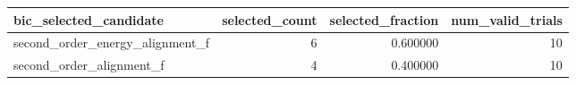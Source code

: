 \begin{tabular}{lrrr}
\toprule
bic_selected_candidate & selected_count & selected_fraction & num_valid_trials \\
\midrule
second_order_energy_alignment_f & 6 & 0.600000 & 10 \\
second_order_alignment_f & 4 & 0.400000 & 10 \\
\bottomrule
\end{tabular}
